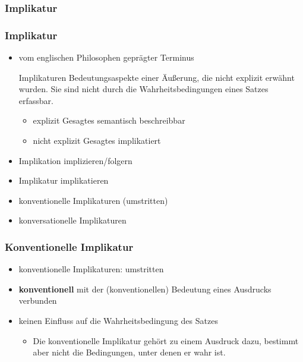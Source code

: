 %
\subsubsection{Implikatur}
%


\begin{frame}
\frametitle{Implikatur}

\begin{itemize}
	\item vom englischen Philosophen \citet{Grice89a} geprägter Terminus
	\medskip
\begin{block}{Implikaturen}
	Bedeutungsaspekte einer Äu\ss{}erung, die nicht explizit erwähnt wurden. Sie sind nicht durch die Wahrheitsbedingungen eines Satzes erfassbar.
\end{block}	


	\begin{itemize}
		\item explizit Gesagtes \ras semantisch beschreibbar
		\item nicht explizit Gesagtes \ras implikatiert
	\end{itemize}


	\item Implikation \ras implizieren/folgern
	\item Implikatur \ras implikatieren
	\medskip
	\item konventionelle Implikaturen (umstritten)
	\item konversationelle Implikaturen
\end{itemize}

\end{frame}



\begin{frame}
\frametitle{Konventionelle Implikatur}

\begin{itemize}
	\item konventionelle Implikaturen: umstritten
	\medskip
	\item \textbf{konventionell} \ras mit der (konventionellen) Bedeutung eines Ausdrucks verbunden
	\medskip
	\item keinen Einfluss auf die Wahrheitsbedingung des Satzes
	
	\begin{itemize}
	\item Die konventionelle Implikatur gehört zu einem Ausdruck dazu, bestimmt aber nicht die Bedingungen, unter denen er wahr ist.
	\end{itemize}
	
\end{itemize}

\end{frame}



